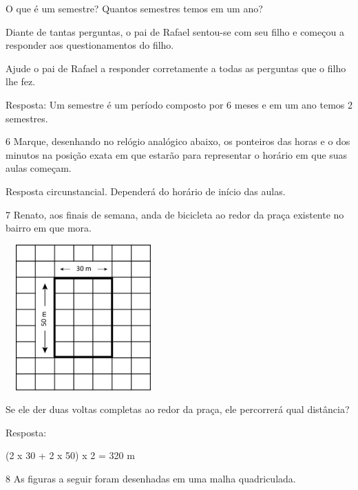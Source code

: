 \begin{escolha}
O que é um semestre? 
Quantos semestres temos em um ano?

Diante de tantas perguntas, o pai de Rafael sentou-se com seu filho e
começou a responder aos questionamentos do filho.

Ajude o pai de Rafael a responder corretamente a todas as perguntas que o filho lhe fez.


Resposta:
Um semestre é um período composto por 6 meses e em um ano temos 2 semestres.

\num{6} Marque, desenhando no relógio analógico abaixo, os ponteiros das horas e o dos
minutos na posição exata em que estarão para representar o horário em que
suas aulas começam.



Resposta circunstancial. Dependerá do horário de início das aulas.


\num{7} Renato, aos finais de semana, anda de bicicleta ao redor da praça existente no bairro em que mora.


\includegraphics[width=2.35256in,height=2.20730in]{media/image55.png}

Se ele der duas voltas completas ao redor da praça, ele percorrerá qual distância?


Resposta:

(2 x 30 + 2 x 50) x 2 = 320 m


\num{8} As figuras a seguir foram desenhadas em uma malha quadriculada.


\end{escolha}
